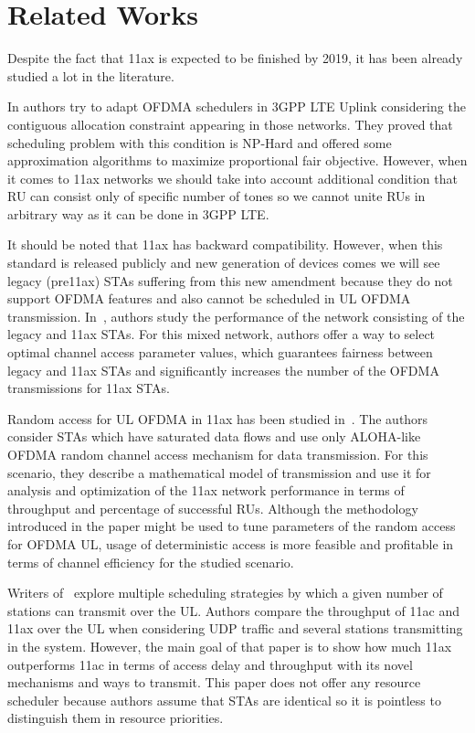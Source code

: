 \section{Related Works}
\label{sec:related}
Despite the fact that 11ax is expected to be finished by 2019, it has been already studied a lot in the literature.

In \cite{lee-proportionalfair} authors try to adapt OFDMA schedulers in 3GPP LTE Uplink considering the contiguous allocation constraint appearing in those networks. They proved that scheduling problem with this condition is NP-Hard and offered some approximation algorithms to maximize proportional fair objective. However, when it comes to 11ax networks we should take into account additional condition that RU can consist only of specific number of tones so we cannot unite RUs in arbitrary way as it can be done in 3GPP LTE. 

It should be noted that 11ax has backward compatibility. 
However, when this standard is released publicly and new generation of devices comes we will see legacy (pre11ax) STAs suffering from this new amendment because they do not support OFDMA features and also cannot be scheduled in UL OFDMA transmission. 
In~\cite{khorov2016several}, authors study the performance of the network consisting of the legacy and 11ax STAs. 
For this mixed network, authors offer a way to select optimal channel access parameter values, which guarantees fairness between legacy and 11ax STAs and significantly increases the number of the OFDMA transmissions for 11ax STAs.

Random access for UL OFDMA in 11ax has been studied in~\cite{lanante2017performance}. 
The authors consider STAs which have saturated data flows and use only ALOHA-like OFDMA random channel access mechanism for data transmission. 
For this scenario, they describe a mathematical model of transmission and use it for analysis and optimization of the 11ax network performance in terms of throughput and percentage of successful RUs. 
Although the methodology introduced in the paper might be used to tune  parameters of the random access for OFDMA UL, usage of deterministic access is more feasible and profitable in terms of channel efficiency for the studied scenario.

Writers of~\cite{sharon2017scheduling} explore multiple scheduling strategies by which a given number of stations can transmit over the UL.
Authors compare the throughput of 11ac and 11ax over the UL when considering UDP traffic and several stations transmitting in the system. 
However, the main goal of that paper is to show how much 11ax outperforms 11ac in terms of access delay and throughput with its novel mechanisms and ways to transmit. 
This paper does not offer any resource scheduler because authors assume that STAs are identical so it is pointless to distinguish them in resource priorities.  

